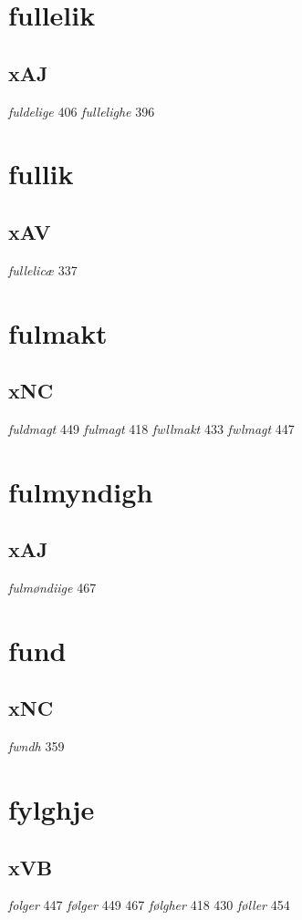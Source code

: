 \documentclass[a4paper,twocolumn]{article}
\begin{document}
\section{fullelik}
\label{sec:org1925314}
\subsection{xAJ}
\label{sec:org4fb7e4b}
\emph{fuldelige} 406 \emph{fullelighe} 396 
\section{fullik}
\label{sec:org581e93a}
\subsection{xAV}
\label{sec:org83bad23}
\emph{fullelicæ} 337 
\section{fulmakt}
\label{sec:org55bf79a}
\subsection{xNC}
\label{sec:org704b837}
\emph{fuldmagt} 449 \emph{fulmagt} 418 \emph{fwllmakt} 433 \emph{fwlmagt} 447 
\section{fulmyndigh}
\label{sec:orgd7e5405}
\subsection{xAJ}
\label{sec:org0cd7ade}
\emph{fulmøndiige} 467 
\section{fund}
\label{sec:org735d88f}
\subsection{xNC}
\label{sec:org0ab6809}
\emph{fwndh} 359 
\section{fylghje}
\label{sec:org8c776b8}
\subsection{xVB}
\label{sec:org182c860}
\emph{folger} 447 \emph{følger} 449 467 \emph{følgher} 418 430 \emph{føller} 454 
\end{document}
